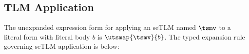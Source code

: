 \documentclass[acmsmall,10pt,review,anonymous]{acmart}\settopmatter{printfolios=true}
\begin{document}
\subsection{TLM Application}\label{sec:U-uetsm-application}
The unexpanded expression form for applying an seTLM named $\tsmv$ to a literal form with literal body $b$ is $\utsmap{\tsmv}{b}$. 
The typed expansion rule governing seTLM application is below:
\begin{mathpar}
\end{mathpar}
\end{document}
